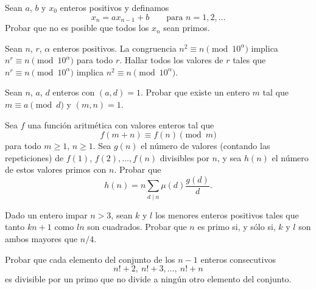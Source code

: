 \documentclass[12pt,a4paper]{book}
\begin{document}
    \begin{ejercicio}
        Sean $a$, $b$ y $x_{0}$ enteros positivos y definamos
        \begin{equation*}
            x_{n}=ax_{n-1}+b\qquad\text{para }n=1,2,\dots
        \end{equation*}
        Probar que no es posible que todos los $x_{n}$ sean primos.
    \end{ejercicio}

    \begin{ejercicio}
        Sean $n$, $r$, $\alpha$ enteros positivos. La congruencia
        $n^{2}\equiv n\pmod{10^{\alpha}}$ implica $n^{r}\equiv n\pmod{10^{\alpha}}$ para todo
        $r$. Hallar todos los valores de $r$ tales que
        $n^{r}\equiv n\pmod{10^{\alpha}}$ implica $n^{2}\equiv n\pmod{10^{\alpha}}$.
    \end{ejercicio}

    \begin{ejercicio}
        Sean $n$, $a$, $d$ enteros con $(a,d)=1$. Probar que existe un entero $m$ tal que
        $m\equiv a\pmod{d}$ y $(m,n)=1$.
    \end{ejercicio}

    \begin{ejercicio}
        Sea $f$ una función aritmética con valores enteros tal que
        \begin{equation*}
            f(m+n)\equiv f(n)\pmod{m}
        \end{equation*}
        para todo $m\geq1$, $n\geq1$. Sea $g(n)$ el número de valores (contando las
        repeticiones) de $f(1)$, $f(2),\dots,f(n)$ divisibles por $n$, y sea $h(n)$ el
        número de estos valores primos con $n$. Probar que
        \begin{equation*}
            h(n)=n\sum_{d\mid n}\mu(d)\frac{g(d)}{d}.
        \end{equation*}
    \end{ejercicio}

    \begin{ejercicio}
        Dado un entero impar $n>3$, sean $k$ y $l$ los menores enteros positivos tales que
        tanto $kn+1$ como $ln$ son cuadrados. Probar que $n$ es primo si, y sólo si, $k$ y
        $l$ son ambos mayores que $n/4$.
    \end{ejercicio}

    \begin{ejercicio}
        Probar que cada elemento del conjunto de los $n-1$ enteros consecutivos
        \begin{equation*}
            n!+2,\ n!+3,\dots,\ n!+n
        \end{equation*}
        es divisible por un primo que no divide a ningún otro elemento del conjunto.
    \end{ejercicio}
\end{document}
